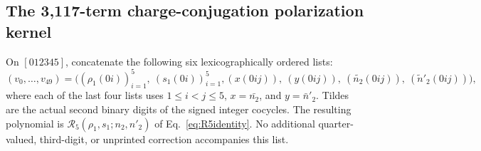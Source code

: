 \subsection{The 3,117-term charge-conjugation polarization kernel}
On $[012345]$, concatenate the following six lexicographically ordered lists:
\begin{equation}
(v_0,\ldots,v_{49})=
\bigl(({\rho_1}(0i))_{i=1}^5,\ ({s_1}(0i))_{i=1}^5,
(x(0ij)),\ (y(0ij)),\ (\widetilde {n_2}(0ij)),\ (\widetilde n'_2(0ij))\bigr),
\end{equation}
where each of the last four lists uses $1\le i<j\le5$, $x=\bar {n_2}$, and $y=\bar n'_2$. Tildes are the actual second binary digits of the signed integer cocycles. The resulting polynomial is $\mathcal R_5({\rho_1},{s_1};{n_2},{n'_2})$ of Eq.~\eqref{eq:R5identity}. No additional quarter-valued, third-digit, or unprinted correction accompanies this list.
